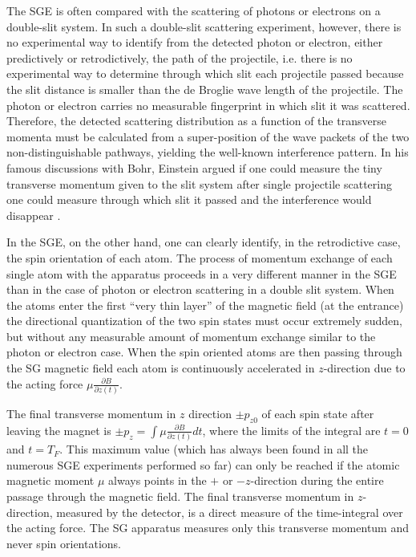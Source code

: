 \documentclass[12pt]{article}
\begin{document}
The SGE is often compared with the scattering of photons or electrons on a double-slit system. In such a double-slit scattering experiment, however, there is no experimental way to identify from the detected photon or electron, either predictively or retrodictively, the path of the projectile, i.e. there is no experimental way to determine through which slit each projectile passed because the slit distance is smaller than the de Broglie wave length of the projectile. The photon or electron carries no measurable fingerprint in which slit it was scattered. Therefore, the detected scattering distribution as a function of the transverse momenta must be calculated from a super-position of the wave packets of the two non-distinguishable pathways, yielding the well-known interference pattern. In his famous discussions with Bohr, Einstein argued if one could measure the tiny transverse momentum given to the slit system after single projectile scattering one could measure through which slit it passed and the interference would disappear \citep{BohrN1949Discussion}.  

In the SGE, on the other hand, one can clearly identify, in the retrodictive case, the spin orientation of each atom. The process of momentum exchange of each single atom with the apparatus proceeds in a very different manner in the SGE  than in the case of photon or electron scattering in a double slit system. When the atoms enter the first ``very thin layer'' of the magnetic field (at the entrance) the directional quantization of the two spin states must occur extremely sudden, but without any measurable amount of momentum exchange similar to the photon or electron case. When the spin oriented atoms are then passing through the SG magnetic field each atom is continuously accelerated  in $z$-direction due to the acting force $\mu\frac{\partial B}{\partial z(t)}$. 

The final transverse momentum in $z$ direction $\pm p_{z0}$  of each spin state after leaving the magnet is $\pm p_z=\int \mu\frac{\partial B}{\partial z(t)} dt$, where the limits of the integral are $t = 0$  and $t = T_F$. This maximum value (which has always been found in all the numerous SGE experiments performed so far) can only be reached if the atomic magnetic moment $\mu$ always points in the $+$ or $-z$-direction during the entire passage through the magnetic field. The final transverse momentum in $z$-direction, measured by the detector,  is a direct measure of the time-integral over the acting force. The SG apparatus measures only this transverse momentum and never spin orientations. 
\end{document}
